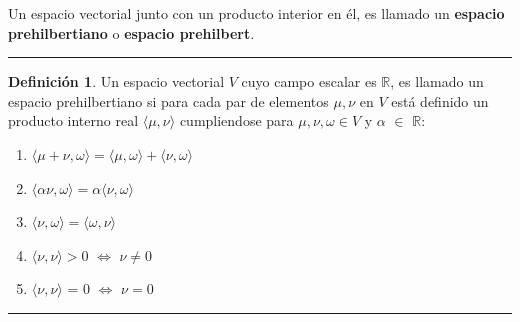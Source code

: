 \documentclass[11pt]{article}
\newcommand{\citar}[1]{\textbf{\underline{Ref:}} \cite{#1}}
\theoremstyle{definition}
\newtheorem{definicion}[defn]{Definición}
\begin{document}
\noindent Un espacio vectorial junto con un producto interior en él, es llamado un \textbf{espacio prehilbertiano} o \textbf{espacio prehilbert}.
\vspace{10 mm}
\hrule
\begin{definicion}\label{def:Prehilbertiano}  
	Un espacio vectorial $V$ cuyo campo escalar es $\mathbb{R}$, es llamado un espacio prehilbertiano si para cada par de elementos $\mu,\nu$ en $V$ está definido un producto interno real $\langle\mu,\nu\rangle$ cumpliendose para $\mu,\nu,\omega \in V$ y $\alpha$ $\in$ $\mathbb{R}$: %
	\begin{enumerate}
		\item $\langle\mu+\nu,\omega\rangle =\langle\mu,\omega\rangle + \langle\nu,\omega\rangle$
		\item $\langle\alpha\nu,\omega\rangle=\alpha\langle\nu,\omega\rangle$
		\item $\langle\nu,\omega\rangle=\langle\omega,\nu\rangle$
		\item $\langle\nu,\nu\rangle > 0$ $\Leftrightarrow$ $\nu\neq0$
		\item $\langle\nu,\nu\rangle$ = 0 $\Leftrightarrow$ $\nu=0$
	\end{enumerate} %
\end{definicion}
\hrule
\end{document}
